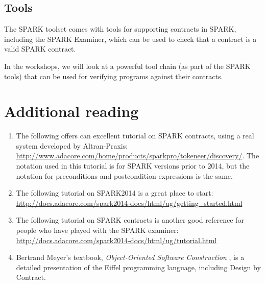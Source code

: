 \subsection{Tools}

The SPARK toolset comes with tools for supporting contracts in SPARK, including the SPARK Examiner, which can be used to check that a contract is a valid SPARK contract.

In the workshops, we will look at a powerful tool chain (as part of the SPARK tools) that can be used for verifying programs against their contracts.



\section{Additional reading}
\label{sec:dbc:additional-reading}

\begin{enumerate}

\item The following offers can excellent tutorial on SPARK contracts, using a real system developed by Altran-Praxis: \url{http://www.adacore.com/home/products/sparkpro/tokeneer/discovery/}. The notation used in this tutorial is for SPARK versions prior to 2014, but the notation for preconditions and postcondition expressions is the same.

 \item The following tutorial on SPARK2014 is a great place to start: \url{http://docs.adacore.com/spark2014-docs/html/ug/getting_started.html}

 \item The following tutorial on SPARK contracts is another good reference for people who have played with the SPARK examiner: \url{http://docs.adacore.com/spark2014-docs/html/ug/tutorial.html}

\item Bertrand Meyer's textbook, \emph{Object-Oriented Software Construction} \cite{meyer00}, is a detailed presentation of the Eiffel programming language, including Design by Contract.

\end{enumerate}

